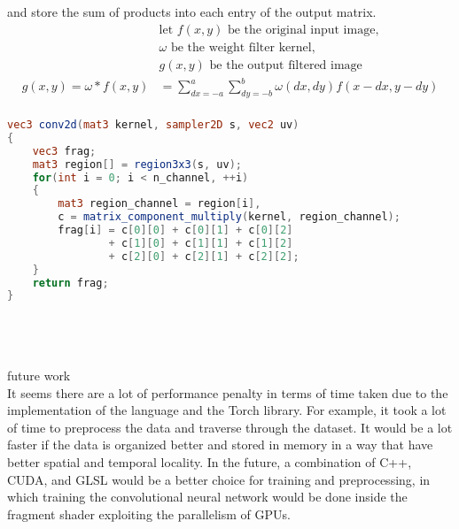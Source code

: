 \documentclass[12pt, border = 4pt, multi]{article} %
\begin{document}
and store the sum of products into each entry of the output matrix.
\begin{align*}
&\text{let } f(x, y) \text{ be the original input image},\\
&\omega \text{ be the weight filter kernel},\\
&g(x, y) \text{ be the output filtered image}\\
g(x, y) = \omega * f(x, y) &= \sum_{dx = -a} ^ a \sum_{dy = -b} ^ b \omega (dx, dy) f(x -dx, y - dy)\\
\end{align*}
\begin{lstlisting}[language = glsl]
vec3 conv2d(mat3 kernel, sampler2D s, vec2 uv)
{
    vec3 frag;
    mat3 region[] = region3x3(s, uv);
    for(int i = 0; i < n_channel, ++i)
    {
        mat3 region_channel = region[i],
        c = matrix_component_multiply(kernel, region_channel);
        frag[i] = c[0][0] + c[0][1] + c[0][2]
                + c[1][0] + c[1][1] + c[1][2]
                + c[2][0] + c[2][1] + c[2][2];
    }
    return frag;
}
\end{lstlisting}
\leavevmode
\noindent
\\
\\
\\
future work\\
It seems there are a lot of performance penalty in terms of time taken due to the implementation of the language and the Torch library. For example, it took a lot of time to preprocess the data and traverse through the dataset. It would be a lot faster if the data is organized better and stored in memory in a way that have better spatial and temporal locality. In the future, a combination of C++, CUDA, and GLSL would be a better choice for training and preprocessing, in which training the convolutional neural network would be done inside the fragment shader exploiting the parallelism of GPUs.
\end{document}
